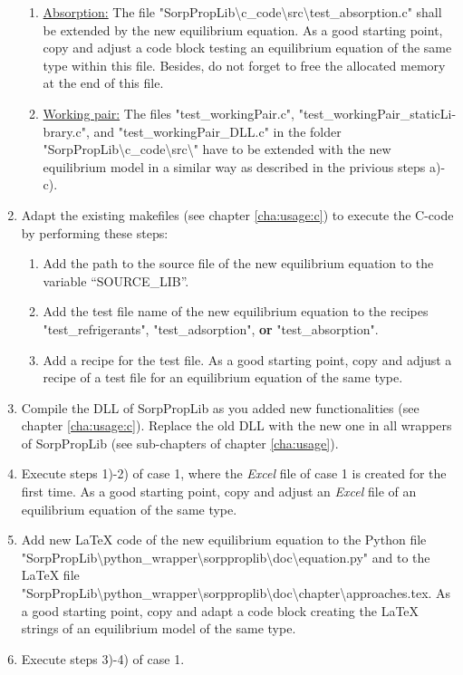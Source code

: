 \begin{enumerate}
\begin{enumerate}
		\item \underline{Absorption:} The file "SorpPropLib\textbackslash c\_code\textbackslash src\textbackslash test\_absorption.c" shall be extended by the new equilibrium equation. As a good starting point, copy and adjust a code block testing an equilibrium equation of the same type within this file. Besides, do not forget to free the allocated memory at the end of this file.
		\item \underline{Working pair:} The files "test\_workingPair.c", "test\_workingPair\_staticLi-brary.c", and "test\_workingPair\_DLL.c" in the folder "SorpPropLib\textbackslash c\_code\newline \textbackslash src\textbackslash " have to be extended with the new equilibrium model in a similar way as described in the privious steps a)-c).
	\end{enumerate}
	\item Adapt the existing makefiles (see chapter \ref{cha:usage:c}) to execute the C-code by performing these steps:
	\begin{enumerate}
		\item Add the path to the source file of the new equilibrium equation to the variable “SOURCE\_LIB”.
		\item Add the test file name of the new equilibrium equation to the recipes "test\_refrigerants", "test\_adsorption", \textbf{or} "test\_absorption".
		\item Add a recipe for the test file. As a good starting point, copy and adjust a recipe of a test file for an equilibrium equation of the same type.
	\end{enumerate}
	\item Compile the DLL of SorpPropLib as you added new functionalities (see chapter \ref{cha:usage:c}). Replace the old DLL with the new one in all wrappers of SorpPropLib (see sub-chapters of chapter \ref{cha:usage}).
	\item Execute steps 1)-2) of case 1, where the \textit{Excel} file of case 1 is created for the first time. As a good starting point, copy and adjust an \textit{Excel} file of an equilibrium equation of the same type.
	\item Add new LaTeX code of the new equilibrium equation to the Python file "SorpPropLib\textbackslash python\_wrapper\textbackslash sorpproplib\textbackslash doc\textbackslash equation.py" and to the LaTeX file "SorpPropLib\textbackslash python\_wrapper\textbackslash sorpproplib\textbackslash doc\textbackslash chapter\textbackslash approaches.tex. As a good starting point, copy and adapt a code block creating the LaTeX strings of an equilibrium model of the same type.
	\item Execute steps 3)-4) of case 1.
\end{enumerate}
